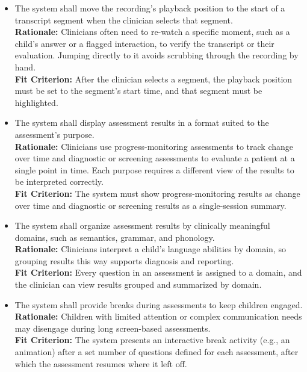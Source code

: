\documentclass[12pt]{article}
\newcounter{reqnum} %
\newcommand{\rthereqnum}{FR\thereqnum}
\begin{document}
\begin{itemize}
\item[\textbf{\rthereqnum} \label{FR_SegmentSeek}:] The system shall move the recording’s playback position to the start of a transcript segment when the clinician selects that segment.
\\ \textbf{Rationale:} Clinicians often need to re-watch a specific moment, such as a child’s answer or a flagged interaction, to verify the transcript or their evaluation. Jumping directly to it avoids scrubbing through the recording by hand.
\\ \textbf{Fit Criterion:} After the clinician selects a segment, the playback position must be set to the segment’s start time, and that segment must be highlighted.

\item[\textbf{\rthereqnum} \label{FR_Label22}:] The system shall display assessment results in a format suited to the assessment’s purpose.
\\ \textbf{Rationale:} Clinicians use progress-monitoring assessments to track change over time and diagnostic or screening assessments to evaluate a patient at a single point in time. Each purpose requires a different view of the results to be interpreted correctly.
\\ \textbf{Fit Criterion:} The system must show progress-monitoring results as change over time and diagnostic or screening results as a single-session summary.

\item[\textbf{\rthereqnum} \label{FR_Label23}:] The system shall organize assessment results by clinically meaningful domains, such as semantics, grammar, and phonology.
\\ \textbf{Rationale:} Clinicians interpret a child's language abilities by domain, so grouping results this way supports diagnosis and reporting.
\\ \textbf{Fit Criterion:} Every question in an assessment is assigned to a domain, and the clinician can view results grouped and summarized by domain.

\item[\textbf{\rthereqnum} \label{FR_Label24}:] The system shall provide breaks during assessments to keep children engaged.
\\ \textbf{Rationale:} Children with limited attention or complex communication needs may disengage during long screen-based assessments.
\\ \textbf{Fit Criterion:} The system presents an interactive break activity (e.g., an animation) after a set number of questions defined for each assessment, after which the assessment resumes where it left off.


\end{itemize}
\end{document}
